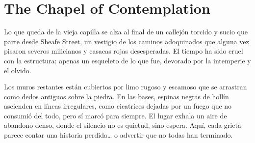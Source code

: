\section{The Chapel of Contemplation}

Lo que queda de la vieja capilla se alza al final de un callejón torcido y
sucio que parte desde Sheafe Street, un vestigio de los caminos adoquinados que
alguna vez pisaron severos milicianos y casacas rojas desesperadas. El tiempo
ha sido cruel con la estructura: apenas un esqueleto de lo que fue, devorado
por la intemperie y el olvido.

Los muros restantes están cubiertos por limo rugoso y escamoso que se arrastran
como dedos antiguos sobre la piedra. En las bases, espinas negras de hollín
ascienden en líneas irregulares, como cicatrices dejadas por un fuego que no
consumió del todo, pero sí marcó para siempre. El lugar exhala un aire de
abandono denso, donde el silencio no es quietud, sino espera. Aquí, cada grieta
parece contar una historia perdida… o advertir que no todas han terminado.
